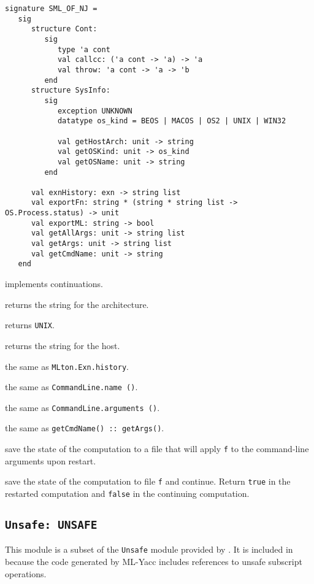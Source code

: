 \begin{verbatim}
signature SML_OF_NJ =
   sig
      structure Cont:
         sig
            type 'a cont
            val callcc: ('a cont -> 'a) -> 'a
            val throw: 'a cont -> 'a -> 'b
         end
      structure SysInfo:
         sig
            exception UNKNOWN
            datatype os_kind = BEOS | MACOS | OS2 | UNIX | WIN32

            val getHostArch: unit -> string
            val getOSKind: unit -> os_kind
            val getOSName: unit -> string
         end

      val exnHistory: exn -> string list
      val exportFn: string * (string * string list -> OS.Process.status) -> unit
      val exportML: string -> bool
      val getAllArgs: unit -> string list
      val getArgs: unit -> string list
      val getCmdName: unit -> string
   end
\end{verbatim}

\begin{description}

 implements continuations.

returns the string for the architecture.

returns {\tt UNIX}.

returns the string for the host.

the same as {\tt MLton.Exn.history}.

the same as {\tt CommandLine.name ()}.

the same as {\tt CommandLine.arguments ()}.

the same as {\tt getCmdName() :: getArgs()}.

save the state of the computation to a file that will apply {\tt f} to
the command-line arguments upon restart.

save the state of the computation to file {\tt f} and continue.
Return {\tt true} in the restarted computation and {\tt false} in the
continuing computation.

\end{description}
%
\subsection{{\tt Unsafe: UNSAFE}}

This module is a subset of the {\tt Unsafe} module provided by
{\smlnj}.  It is included in {\mlton} because the code generated by
ML-Yacc includes references to unsafe subscript operations.


